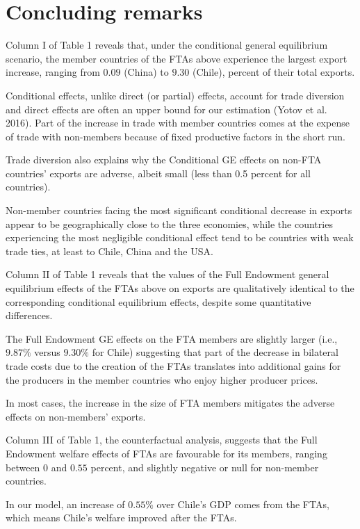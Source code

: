 \documentclass[10pt]{article}
\begin{document}
\hypertarget{concluding-remarks}{%
\section{Concluding remarks}\label{concluding-remarks}}

Column I of Table 1 reveals that, under the conditional general
equilibrium scenario, the member countries of the FTAs above experience
the largest export increase, ranging from \(0.09\) (China) to \(9.30\)
(Chile), percent of their total exports.

Conditional effects, unlike direct (or partial) effects, account for
trade diversion and direct effects are often an upper bound for our
estimation (Yotov et al. 2016). Part of the increase in trade with
member countries comes at the expense of trade with non-members because
of fixed productive factors in the short run.

Trade diversion also explains why the Conditional GE effects on non-FTA
countries' exports are adverse, albeit small (less than 0.5 percent for
all countries).

Non-member countries facing the most significant conditional decrease in
exports appear to be geographically close to the three economies, while
the countries experiencing the most negligible conditional effect tend
to be countries with weak trade ties, at least to Chile, China and the
USA.

Column II of Table 1 reveals that the values of the Full Endowment
general equilibrium effects of the FTAs above on exports are
qualitatively identical to the corresponding conditional equilibrium
effects, despite some quantitative differences.

The Full Endowment GE effects on the FTA members are slightly larger
(i.e., \(9.87\%\) versus \(9.30\%\) for Chile) suggesting that part of
the decrease in bilateral trade costs due to the creation of the FTAs
translates into additional gains for the producers in the member
countries who enjoy higher producer prices.

In most cases, the increase in the size of FTA members mitigates the
adverse effects on non-members' exports.

Column III of Table 1, the counterfactual analysis, suggests that the
Full Endowment welfare effects of FTAs are favourable for its members,
ranging between \(0\) and \(0.55\) percent, and slightly negative or
null for non-member countries.

In our model, an increase of \(0.55\%\) over Chile's GDP comes from the
FTAs, which means Chile's welfare improved after the FTAs.
\end{document}
